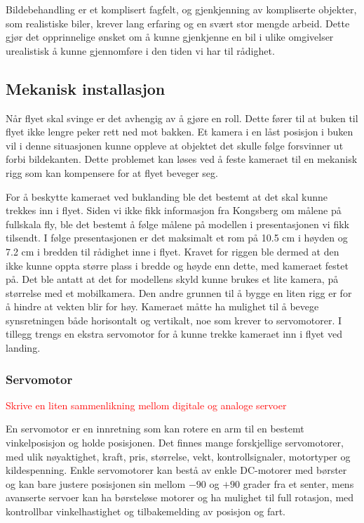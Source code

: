 Bildebehandling er et komplisert fagfelt, og gjenkjenning av kompliserte objekter, som realistiske biler, krever lang erfaring og en svært stor mengde arbeid. Dette gjør det opprinnelige ønsket om å kunne gjenkjenne en bil i ulike omgivelser urealistisk å kunne gjennomføre i den tiden vi har til rådighet.

\subsection{Mekanisk installasjon}
Når flyet skal svinge er det avhengig av å gjøre en roll. Dette fører til at buken til flyet ikke lengre peker rett ned mot bakken. Et kamera i en låst posisjon i buken vil i denne situasjonen kunne oppleve at objektet det skulle følge forsvinner ut forbi bildekanten. Dette problemet kan løses ved å feste kameraet til en mekanisk rigg som kan kompensere for at flyet beveger seg.

For å beskytte kameraet ved buklanding ble det bestemt at det skal kunne trekkes inn i flyet. Siden vi ikke fikk informasjon fra Kongsberg om målene på fullskala fly, ble det bestemt å følge målene på modellen i presentasjonen vi fikk tilsendt. I følge presentasjonen er det maksimalt et rom på 10.5 cm i høyden og 7.2 cm i bredden til rådighet inne i flyet. Kravet for riggen ble dermed at den ikke kunne oppta større plass i bredde og høyde enn dette, med kameraet festet på. Det ble antatt at det for modellens skyld kunne brukes et lite kamera, på størrelse med et mobilkamera. Den andre grunnen til å bygge en liten rigg er for å hindre at vekten blir for høy. Kameraet måtte ha mulighet til å bevege synsretningen både horisontalt og vertikalt, noe som krever to servomotorer. I tillegg trengs en ekstra servomotor for å kunne trekke kameraet inn i flyet ved landing.

\subsubsection{Servomotor}
\textcolor{red}{Skrive en liten sammenlikning mellom digitale og analoge servoer}

En servomotor er en innretning som kan rotere en arm til en bestemt vinkelposisjon og holde posisjonen. Det finnes mange forskjellige servomotorer, med ulik nøyaktighet, kraft, pris, størrelse, vekt, kontrollsignaler, motortyper og kildespenning. Enkle servomotorer kan bestå av enkle DC-motorer med børster og kan bare justere posisjonen sin mellom $-90$ og $+90$ grader fra et senter, mens avanserte servoer kan ha børsteløse motorer og ha mulighet til full rotasjon, med kontrollbar vinkelhastighet og tilbakemelding av posisjon og fart.

